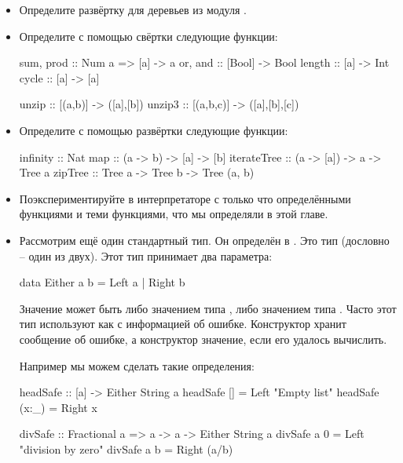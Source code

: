 \begin{itemize}

\item Определите развёртку для деревьев из модуля . 

\item Определите с помощью свёртки следующие функции:

\begin{code}
sum, prod  :: Num a => [a] -> a
or,  and   :: [Bool] -> Bool
length     :: [a] -> Int
cycle      :: [a] -> [a]

unzip      :: [(a,b)] -> ([a],[b])
unzip3     :: [(a,b,c)] -> ([a],[b],[c])
\end{code}


\item Определите с помощью развёртки следующие функции:

\begin{code}
infinity    :: Nat
map         :: (a -> b) -> [a] -> [b]
iterateTree :: (a -> [a]) -> a -> Tree a
zipTree     :: Tree a -> Tree b -> Tree (a, b)
\end{code}

\item Поэкспериментируйте в интерпретаторе с только 
    что определёнными функциями и теми функциями, что мы 
    определяли в этой главе.

\item Рассмотрим ещё один стандартный тип. Он определён в .
Это тип  (дословно -- один из двух). Этот тип
принимает два параметра:

\begin{code}
data Either a b = Left a | Right b
\end{code}

Значение может быть либо значением типа , либо
значением типа . Часто этот тип используют как 
 с информацией об ошибке. Конструктор 
хранит сообщение об ошибке, а конструктор  
значение, если его удалось вычислить.

Например мы можем сделать такие определения:

\begin{code}
headSafe :: [a] -> Either String a
headSafe []     = Left "Empty list" 
headSafe (x:_)  = Right x

divSafe :: Fractional a => a -> a -> Either String a
divSafe a 0 = Left "division by zero"
divSafe a b = Right (a/b)
\end{code}


\end{itemize}
